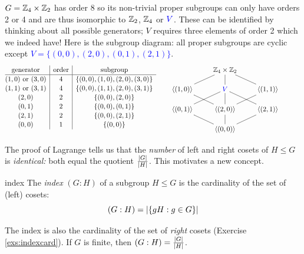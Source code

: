 \begin{example}{}{}
	$G=\mathbb{Z}_4\times\mathbb{Z}_2$ has order 8 so its non-trivial proper subgroups can only have orders 2 or 4 and are thus isomorphic to $\mathbb{Z}_2$, $\mathbb{Z}_4$ or $\textcolor{blue}{V}$. These can be identified by thinking about all possible generators; $V$ requires three elements of order 2 which we indeed have! Here is the subgroup diagram: all proper subgroups are cyclic except \textcolor{blue}{$V=\{(0,0),(2,0),(0,1),(2,1)\}$}.
	\[
		\def\arraystretch{1.1}
		\begin{array}[t]{@{}c|c|c}
			\text{generator}&\text{order}&\text{subgroup}\\\hline
			(1,0)\text{ or }(3,0) & 4 & \{(0,0),(1,0),(2,0),(3,0)\}\\
			(1,1)\text{ or }(3,1) & 4 & \{(0,0),(1,1),(2,0),(3,1)\}\\
			(2,0) & 2 & \{(0,0),(2,0)\}\\
			(0,1) & 2 & \{(0,0),(0,1)\}\\
			(2,1) & 2 & \{(0,0),(2,1)\}\\
			(0,0) & 1 & \{(0,0)\}
		\end{array}
		\qquad
		\xymatrix @R13pt{%
			&\Z_4\times\Z_2 \ar@/_0pc/@{-}[dl] \ar@{-}[d] \ar@{-}[dr]&\\
			\ip{(1,0)} \ar@{-}[dr] & \textcolor{blue}{V} \ar@{-}[dl] \ar@{-}[d] \ar@{-}[dr] & \ip{(1,1)} \ar@{-}[dl]\\
			\ip{(0,1)} \ar@{-}[dr] & \ip{(2,0)} \ar@{-}[d] & \ip{(2,1)} \ar@{-}[dl] &\\
			&\ip{(0,0)}&
		}
	\]
\end{example}


\goodbreak


The proof of Lagrange tells us that the \emph{number} of left and right cosets of $H\le G$ is \emph{identical:} both equal the quotient $\frac{\left| G\right|}{\left| H\right|}$. This motivates a new concept.

\begin{defn}{}{index}
	The \emph{index} $(G:H)$ of a subgroup $H\le G$ is the cardinality of the set of (left) cosets:
	\[
		(G:H)=\left| \{gH:g\in G\}\right|
	\]
\end{defn}

The index is also the cardinality of the set of \emph{right} cosets (Exercise \ref{exs:indexcard}). If $G$ is finite, then $(G:H)=\frac{\left| G\right|}{\left| H\right|}$.


